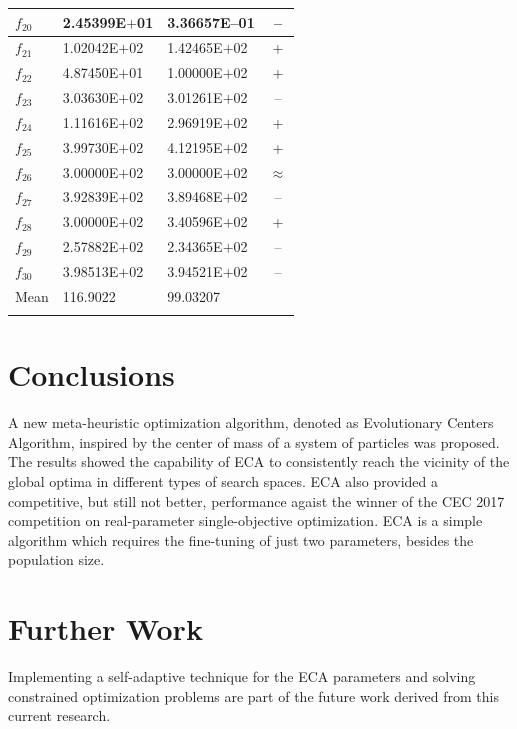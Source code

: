 \documentclass[graybox]{svmult}
\begin{document}
\begin{table}[!ht]
{\begin{tabular}{p{1cm}p{2.5cm}p{2.5cm}c}
		$f_{20}$ & 2.45399E$+$01  & 3.36657E--01 & --  \\ \hline
		$f_{21}$ & 1.02042E$+$02  & 1.42465E$+$02 & +  \\ \hline
		$f_{22}$ & 4.87450E$+$01  & 1.00000E$+$02 & +  \\ \hline
		$f_{23}$ & 3.03630E$+$02  & 3.01261E$+$02 & --  \\ \hline
		$f_{24}$ & 1.11616E$+$02  & 2.96919E$+$02 & +  \\ \hline
		$f_{25}$ & 3.99730E$+$02  & 4.12195E$+$02 & +  \\ \hline
		$f_{26}$ & 3.00000E$+$02  & 3.00000E$+$02 & $\approx$  \\ \hline
		$f_{27}$ & 3.92839E$+$02  & 3.89468E$+$02 & --  \\ \hline
		$f_{28}$ & 3.00000E$+$02  & 3.40596E$+$02 & +  \\ \hline
		$f_{29}$ & 2.57882E$+$02  & 2.34365E$+$02 & --  \\ \hline
		$f_{30}$ & 3.98513E$+$02  & 3.94521E$+$02 & --  \\ \svhline
			Mean & 116.9022       & 99.03207 & \\ \svhline
	\end{tabular}
}
\end{table}



\section{Conclusions} %
\label{sec:conclusions}

A new meta-heuristic optimization algorithm, denoted as Evolutionary Centers 
Algorithm, inspired by the center of mass of a system of particles was proposed. 
The results showed the capability of ECA to consistently reach the vicinity 
of the global optima in different types of search spaces. ECA also provided 
a competitive, but still not better, performance agaist the winner of the 
CEC 2017 competition on real-parameter single-objective optimization. ECA 
is a simple algorithm which requires the fine-tuning of just two parameters, 
besides the population size.\\



\section{Further Work} %
\label{sec:further_work}

Implementing a self-adaptive technique for the ECA parameters and solving 
constrained optimization problems are part of the future work derived 
from this current research. 


\clearpage


\end{document}
